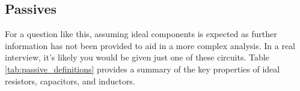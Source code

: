 \documentclass[main.tex]{subfiles}
\begin{document}


\spoilerline

\subsection{Passives}
\noindent For a question like this, assuming ideal components is expected as further information has not been provided to aid in a more complex analysis. In a real interview, it's likely you would be given just one of these circuits. Table \ref{tab:passive_definitions} provides a summary of the key properties of ideal resistors, capacitors, and inductors.
\end{document}
